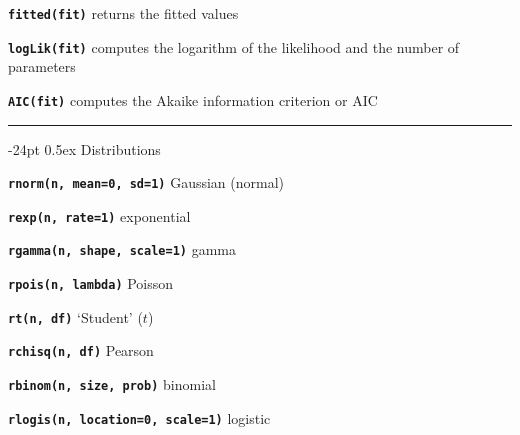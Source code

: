 \documentclass[8pt,landscape]{article}
\makeatletter
\renewcommand\section{\@startsection{section}{1}{0mm}%
                                     {-24pt}%
                                     {0.5ex}%
                                {\color{blue}\normalfont\large\bfseries}}
\newcommand{\code}{\texttt}
\newcommand{\bcode}[1]{\texttt{\textbf{#1}}}
\makeatother
\begin{document}
\begin{multicols*}{3}
\bcode{fitted(fit)}  returns the fitted values

\bcode{logLik(fit)}  computes the logarithm of the likelihood and the number of parameters

\bcode{AIC(fit)}  computes the Akaike information criterion or AIC

\bigskip

\rule{.3\textwidth}{0.4pt}


% 
% 
% 











\bigskip

\section{Distributions}

\bcode{rnorm(n, mean=0, sd=1)} Gaussian (normal)  

\bcode{rexp(n, rate=1)} exponential

\bcode{rgamma(n, shape, scale=1)} gamma  

\bcode{rpois(n, lambda)} Poisson




\bcode{rt(n, df)} `Student' ($t$)  


\bcode{rchisq(n, df)} Pearson 

\bcode{rbinom(n, size, prob)} binomial  



\bcode{rlogis(n, location=0, scale=1)} logistic  



\end{multicols*}
\end{document}
